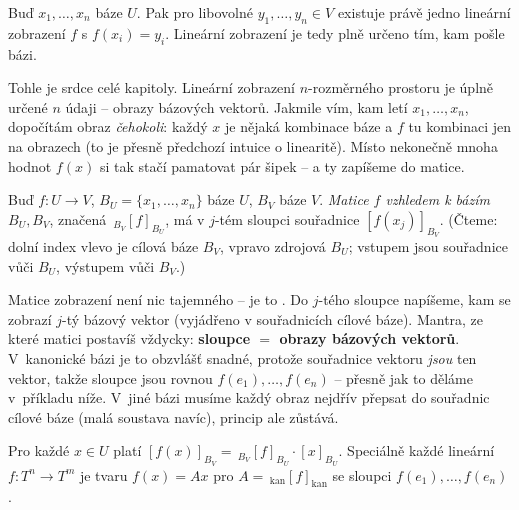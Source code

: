 \documentclass[11pt,a4paper]{article}
\begin{document}
\begin{veta}
Buď $x_1,\dots,x_n$ báze $U$. Pak pro libovolné $y_1,\dots,y_n\in V$ existuje právě jedno lineární zobrazení $f$ s $f(x_i)=y_i$. Lineární zobrazení je tedy plně určeno tím, kam pošle bázi.
\end{veta}

\begin{intuice}
Tohle je srdce celé kapitoly. Lineární zobrazení $n$-rozměrného prostoru je úplně určené $n$ údaji -- obrazy bázových vektorů. Jakmile vím, kam letí $x_1,\dots,x_n$, dopočítám obraz \emph{čehokoli}: každý $x$ je nějaká kombinace báze a $f$ tu kombinaci jen  na obrazech (to je přesně předchozí intuice o linearitě). Místo nekonečně mnoha hodnot $f(x)$ si tak stačí pamatovat pár šipek -- a ty zapíšeme do matice.
\end{intuice}

\begin{definice}
Buď $f:U\to V$, $B_U=\{x_1,\dots,x_n\}$ báze $U$, $B_V$ báze $V$. \emph{Matice $f$ vzhledem k bázím} $B_U,B_V$, značená $\,{}_{B_V}[f]_{B_U}$, má v $j$-tém sloupci souřadnice $[f(x_j)]_{B_V}$. (Čteme: dolní index vlevo je cílová báze $B_V$, vpravo zdrojová $B_U$; vstupem jsou souřadnice vůči $B_U$, výstupem vůči $B_V$.)
\end{definice}

\begin{intuice}
Matice zobrazení není nic tajemného -- je to . Do $j$-tého sloupce napíšeme, kam se zobrazí $j$-tý bázový vektor (vyjádřeno v souřadnicích cílové báze). Mantra, ze které matici postavíš vždycky: \textbf{sloupce $=$ obrazy bázových vektorů}. V~kanonické bázi je to obzvlášť snadné, protože souřadnice vektoru \emph{jsou} ten vektor, takže sloupce jsou rovnou $f(e_1),\dots,f(e_n)$ -- přesně jak to děláme v~příkladu níže. V~jiné bázi musíme každý obraz nejdřív přepsat do souřadnic cílové báze (malá soustava navíc), princip  ale zůstává.
\end{intuice}

\begin{veta}
Pro každé $x\in U$ platí $[f(x)]_{B_V}=\,{}_{B_V}[f]_{B_U}\cdot[x]_{B_U}$. Speciálně každé lineární $f:T^n\to T^m$ je tvaru $f(x)=Ax$ pro $A=\,{}_{\mathrm{kan}}[f]_{\mathrm{kan}}$ se sloupci $f(e_1),\dots,f(e_n)$.
\end{veta}
\end{document}
